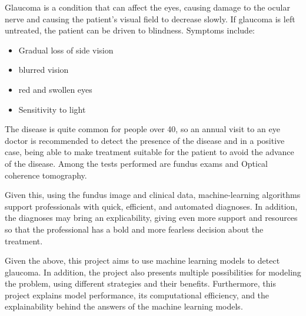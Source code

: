 Glaucoma is a condition that can affect the eyes, causing damage to the ocular nerve and causing the patient's visual field to decrease slowly. If glaucoma is left untreated, the patient can be driven to blindness. Symptoms include:
\begin{itemize}
    \item Gradual loss of side vision
    \item blurred vision
    \item red and swollen eyes
    \item Sensitivity to light
\end{itemize}
The disease is quite common for people over 40, so an annual visit to an eye doctor is recommended to detect the presence of the disease and in a positive case, being able to make treatment suitable for the patient to avoid the advance of the disease. Among the tests performed are fundus exams and Optical coherence tomography.

Given this, using the fundus image and clinical data, machine-learning algorithms support professionals with quick, efficient, and automated diagnoses. In addition, the diagnoses may bring an explicability, giving even more support and resources so that the professional has a bold and more fearless decision about the treatment.

Given the above, this project aims to use machine learning models to detect glaucoma. In addition, the project also presents multiple possibilities for modeling the problem, using different strategies and their benefits. Furthermore, this project explains model performance, its computational efficiency, and the explainability behind the answers of the machine learning models.

